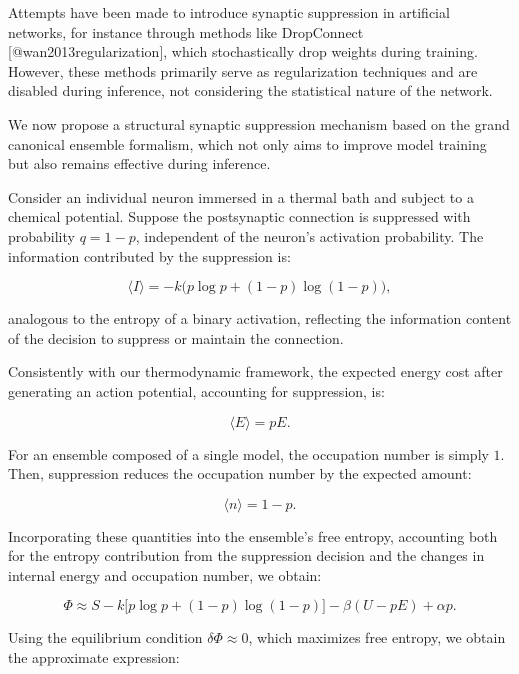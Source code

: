 \documentclass[12pt]{article}
\begin{document}
Attempts have been made to introduce synaptic suppression in artificial networks, for instance through methods like DropConnect [@wan2013regularization], which stochastically drop weights during training. However, these methods primarily serve as regularization techniques and are disabled during inference, not considering the statistical nature of the network.

We now propose a structural synaptic suppression mechanism based on the grand canonical ensemble formalism, which not only aims to improve model training but also remains effective during inference.

Consider an individual neuron immersed in a thermal bath and subject to a chemical potential. Suppose the postsynaptic connection is suppressed with probability $q = 1-p$, independent of the neuron’s activation probability. The information contributed by the suppression is:

\begin{equation}
\langle I \rangle = -k \big( p \log p + (1-p) \log(1-p) \big),
\end{equation}

analogous to the entropy of a binary activation, reflecting the information content of the decision to suppress or maintain the connection.

Consistently with our thermodynamic framework, the expected energy cost after generating an action potential, accounting for suppression, is:

\begin{equation}
\langle E \rangle = p E.
\end{equation}

For an ensemble composed of a single model, the occupation number is simply $1$. Then, suppression reduces the occupation number by the expected amount:

\begin{equation}
\langle n \rangle = 1-p.
\end{equation}

Incorporating these quantities into the ensemble’s free entropy, accounting both for the entropy contribution from the suppression decision and the changes in internal energy and occupation number, we obtain:

\begin{equation}
\Phi \approx S - k \big[ p \log p + (1-p) \log(1-p) \big] - \beta (U-p E) + \alpha p.
\end{equation}

Using the equilibrium condition $\delta \Phi \approx 0$, which maximizes free entropy, we obtain the approximate expression:
\end{document}

